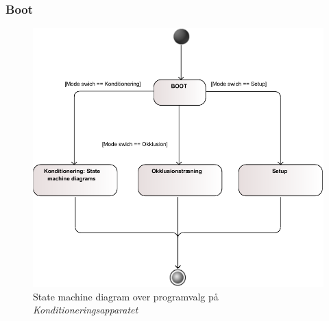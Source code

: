 \subsubsection{Boot}
\begin{figure}[H]
\includegraphics[width=\textwidth]{pdfs/STM_BOOT-crop.pdf} 
\caption{State machine diagram over programvalg på \textit{Konditioneringsapparatet}}
\end{figure}

\newpage
